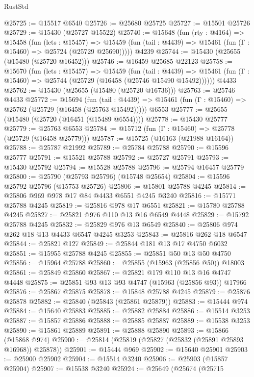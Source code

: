 \begin{lexlean}{RustStd}
\begin{coremodule}
@25725 := @15517 @6540
@25726 := @25680 @25725
@25727 := @15501 @25726
@25729 := @15430 (@25727 @15522)
@25740 := @15648
    (fun (rty : @4164) =>
    @15458
      (fun (lets : @15457) =>
      @15459 (fun (tail : @4439) => @15461 (fun (Γ : @15460) => @25724 (@25729 @25690)))))
    @4239
@25744 := @15430 (@25655 (@15480 (@25720 @16452)))
@25746 := @16459 @25685 @22123
@25758 := @15670
    (fun (lets : @15457) =>
    @15459
      (fun (tail : @4439) =>
      @15461 (fun (Γ : @15460) => @25744 (@25729 (@16458 (@25746 @15490 @15492))))))
    @4433
@25762 := @15430 (@25655 (@15480 (@25720 @16736)))
@25763 := @25746 @4433
@25772 := @15694
    (fun (tail : @4439) => @15461 (fun (Γ : @15460) => @25762 (@25729 (@16458 (@25763 @15492)))))
    @6553
@25777 := @25655 (@15480 (@25720 (@16451 (@15489 @6554))))
@25778 := @15430 @25777
@25779 := @25763 @6553
@25784 := @15712 (fun (Γ : @15460) => @25778 (@25729 (@16458 @25779)))
@25787 := @15725 (@16163 (@21988 @16164))
@25788 := @25787 @21992
@25789 := @25784 @25788
@25790 := @15596 @25777
@25791 := @15521 @25788
@25792 := @25727 @25791
@25793 := @15430 @25792
@25794 := @15528 @25788
@25796 := @25794 @16457 @25779
@25800 := @25790 (@25793 @25796) (@15748 @25654)
@25804 := @15596 @25792 @25796 (@15753 @25726)
@25806 := @15801 @25788 @4245
@25814 := @25806 @969 @978 @17 @84 @4433 @6551 @4245 @3240
@25816 := @15771 @25788 @4245
@25819 := @25816 @978 @17 @6551
@25821 := @15780 @25788 @4245
@25827 := @25821 @976 @110 @13 @16 @6549 @4448
@25829 := @15792 @25788 @4245
@25832 := @25829 @976 @13 @6549
@25840 := @25806 @974 @262 @18 @13 @4433 @6547 @4245 @3253
@25843 := @25816 @262 @18 @6547
@25844 := @25821 @127
@25849 := @25844 @181 @13 @17 @4750 @6032
@25851 := @15955 @25788 @4245
@25855 := @25851 @50 @13 @50 @4750
@25856 := @15964 @25788
@25860 := @25855 (@15963 (@25856 @50)) @18003
@25861 := @25849 @25860
@25867 := @25821 @179 @110 @13 @16 @4747 @4448
@25875 := @25851 @93 @13 @93 @4747 (@15963 (@25856 @93)) @17966
@25876 := @25867 @25875
@25878 := @15848 @25788 @4245
@25879 := @25876 @25878
@25882 := @25840 (@25843 (@25861 @25879))
@25883 := @15444 @974
@25884 := @15640 @25883
@25885 := @25882 @25884
@25886 := @15514 @3253
@25887 := @15857 @25886
@25888 := @25885 @25887
@25889 := @15538 @3253
@25890 := @15861 @25889
@25891 := @25888 @25890
@25893 := @15866 (@15868 @974)
@25900 := @25814 (@25819 (@25827 (@25832 (@25891 @25893 @16968)) @25878))
@25901 := @15444 @969
@25902 := @15640 @25901
@25903 := @25900 @25902
@25904 := @15514 @3240
@25906 := @25903 (@15857 @25904)
@25907 := @15538 @3240
@25924 := @25649
    (@25674
      (@25715

\end{coremodule}
\end{lexlean}
